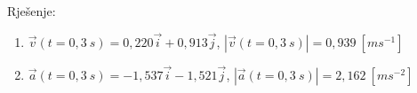 

Rješenje:

\begin{enumerate}[label=\alph*)]
 \item $\vec{v}(t=0,3\ s)= 0,220\vec{i} + 0,913\vec{j}$, $|\vec{v}(t=0,3\ s)|=0,939\ [ms^{-1}]$
 \item $\vec{a}(t=0,3\ s)= -1,537\vec{i}-1,521\vec{j}$, $|\vec{a}(t=0,3\ s)|= 2,162\ [ms^{-2}]$
\end{enumerate}
